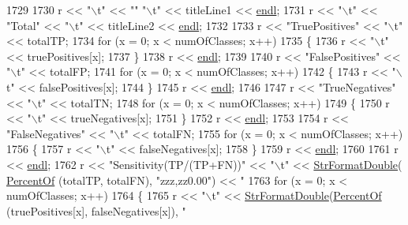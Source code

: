 \begin{DoxyCode}
1729 
1730   r << \textcolor{stringliteral}{"\(\backslash\)t"} << \textcolor{stringliteral}{""}         \textcolor{stringliteral}{"\(\backslash\)t"} << titleLine1 << \hyperlink{namespace_k_k_b_ad1f50f65af6adc8fa9e6f62d007818a8}{endl};
1731   r << \textcolor{stringliteral}{"\(\backslash\)t"} << \textcolor{stringliteral}{"Total"} << \textcolor{stringliteral}{"\(\backslash\)t"} << titleLine2 << \hyperlink{namespace_k_k_b_ad1f50f65af6adc8fa9e6f62d007818a8}{endl};
1732 
1733   r << \textcolor{stringliteral}{"TruePositives"} << \textcolor{stringliteral}{"\(\backslash\)t"} << totalTP;
1734   \textcolor{keywordflow}{for}  (x = 0;  x < numOfClasses;  x++)
1735   \{
1736     r << \textcolor{stringliteral}{"\(\backslash\)t"} << truePositives[x];
1737   \}
1738   r << \hyperlink{namespace_k_k_b_ad1f50f65af6adc8fa9e6f62d007818a8}{endl};
1739 
1740   r << \textcolor{stringliteral}{"FalsePositives"} << \textcolor{stringliteral}{"\(\backslash\)t"} << totalFP;
1741   \textcolor{keywordflow}{for}  (x = 0;  x < numOfClasses;  x++)
1742   \{
1743     r << \textcolor{stringliteral}{"\(\backslash\)t"} << falsePositives[x];
1744   \}
1745   r << \hyperlink{namespace_k_k_b_ad1f50f65af6adc8fa9e6f62d007818a8}{endl};
1746 
1747   r << \textcolor{stringliteral}{"TrueNegatives"} << \textcolor{stringliteral}{"\(\backslash\)t"} << totalTN;
1748   \textcolor{keywordflow}{for}  (x = 0;  x < numOfClasses;  x++)
1749   \{
1750     r << \textcolor{stringliteral}{"\(\backslash\)t"} << trueNegatives[x];
1751   \}
1752   r << \hyperlink{namespace_k_k_b_ad1f50f65af6adc8fa9e6f62d007818a8}{endl};
1753 
1754   r << \textcolor{stringliteral}{"FalseNegatives"}  << \textcolor{stringliteral}{"\(\backslash\)t"} << totalFN;
1755   \textcolor{keywordflow}{for}  (x = 0;  x < numOfClasses;  x++)
1756   \{
1757     r << \textcolor{stringliteral}{"\(\backslash\)t"} << falseNegatives[x];
1758   \}
1759   r << \hyperlink{namespace_k_k_b_ad1f50f65af6adc8fa9e6f62d007818a8}{endl};
1760 
1761   r << \hyperlink{namespace_k_k_b_ad1f50f65af6adc8fa9e6f62d007818a8}{endl};
1762   r << \textcolor{stringliteral}{"Sensitivity(TP/(TP+FN))"} << \textcolor{stringliteral}{"\(\backslash\)t"} << \hyperlink{namespace_k_k_b_a1a40a40e955fa5417a7cdd990e0021b1}{StrFormatDouble}(
      \hyperlink{_confusion_matrix2_8cpp_ac6428bbca684e442948860947ad8ca02}{PercentOf} (totalTP, totalFN), \textcolor{stringliteral}{"zzz,zz0.00"}) << \textcolor{stringliteral}{"%
1763   \textcolor{keywordflow}{for}  (x = 0;  x < numOfClasses;  x++)
1764   \{
1765     r << \textcolor{stringliteral}{"\(\backslash\)t"} << \hyperlink{namespace_k_k_b_a1a40a40e955fa5417a7cdd990e0021b1}{StrFormatDouble}(\hyperlink{_confusion_matrix2_8cpp_ac6428bbca684e442948860947ad8ca02}{PercentOf} (truePositives[x], falseNegatives[x]), \textcolor{stringliteral}{"
}}
\end{DoxyCode}
